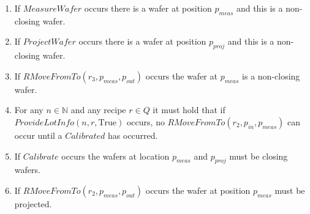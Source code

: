 \begin{enumerate}
    \item If $\mathit{MeasureWafer}$ occurs there is a wafer at position $p_\mathit{meas}$ and this is a non-closing wafer.

    \item If $\mathit{ProjectWafer}$ occurs there is a wafer at position $p_\mathit{proj}$ and this is a non-closing wafer.

    \item If $\mathit{RMoveFromTo}(r_3,p_\mathit{meas}, p_\mathit{out})$ occurs the wafer at $p_\mathit{meas}$ is a non-closing wafer.

    \item For any $n \in \mathbb{N}$ and any recipe $r \in Q$ it must hold that if $\mathit{ProvideLotInfo}(n, r, \text{True})$ occurs, no $\mathit{RMoveFromTo}(r_2, p_\mathit{in}, p_\mathit{meas})$ can occur until a $\mathit{Calibrated}$ has occurred.

    \item If $\mathit{Calibrate}$ occurs the wafers at location $p_\mathit{meas}$ and $p_\mathit{proj}$ must be closing wafers.

    \item If $\mathit{RMoveFromTo}\left(r_2, p_\mathit{meas}, p_\mathit{out}\right)$ occurs the wafer at position $p_\mathit{meas}$ must be projected.
\end{enumerate}
